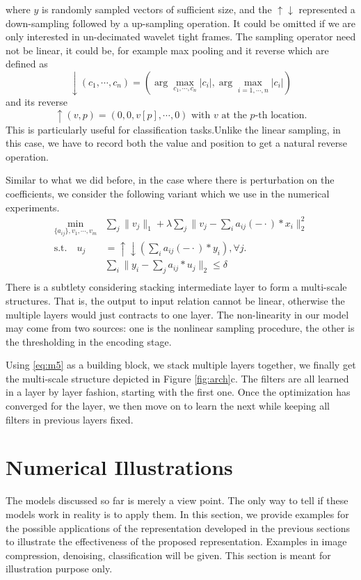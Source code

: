 \documentclass[a4paper]{article}
\begin{document}
where $y$ is randomly sampled vectors of sufficient size, and the $\uparrow \downarrow$ represented a down-sampling followed by a up-sampling operation. It could be omitted if we are only interested in un-decimated wavelet tight frames. The sampling operator need not be linear, it could be, for example max pooling and it reverse which are defined as 
\[
\downarrow(c_1,\cdots,c_n) = (\arg\max_{c_1,\cdots,c_n} |c_i|, \arg\max_{i=1,\cdots,n} |c_i|)
\]
and its reverse
\[
\uparrow(v,p)=(0,0,v[p],\cdots,0) \textrm{ with $v$ at the $p$-th location}.
\]
This is particularly useful for classification tasks.Unlike the linear sampling, in this case, we have to record both the value and position to get a natural reverse operation.

Similar to what we did before, in the case where there is perturbation on the coefficients, we consider the following variant which we use in the numerical experiments.
\begin{equation}
\label{eq:m5}
\begin{aligned}
\min_{\{a_{ij}\}, v_1,\cdots,v_m}& \sum_j \|v_j\|_1 + \lambda \sum_j \|v_j-  \sum_{i} a_{ij}(-\cdot)*x_i \|_2^2\\
 \textrm{s.t.}  	\quad 	u_j&=\uparrow\downarrow(\sum_i a_{ij}(-\cdot)*y_i), \forall j.\\
&\sum_i \|y_i - \sum_j a_{ij}*u_j\|_2  \leq \delta\\
\end{aligned}
\end{equation}
There is a subtlety considering stacking intermediate layer to form a multi-scale structures. That is, the output to input relation cannot be linear, otherwise the multiple layers would just contracts to one layer. The non-linearity in our model may come from two sources: one is the nonlinear sampling procedure, the other is the thresholding in the encoding stage.

Using \eqref{eq:m5} as a building block, we stack multiple layers together, we finally get the multi-scale structure depicted in Figure \ref{fig:arch}c. The filters are all learned in a  layer by layer fashion, starting with the first one. Once the optimization has converged for the layer, we then move on to learn the next while keeping all filters in previous layers fixed. 

\section{Numerical Illustrations}
The models discussed so far is merely a view point. The only way to tell if these models work in reality is to apply them. In this section, we provide examples for the possible applications of the representation developed in the previous sections to illustrate the effectiveness of the proposed representation. Examples in image compression, denoising, classification will be given. This section is meant for illustration purpose only.
\end{document}
